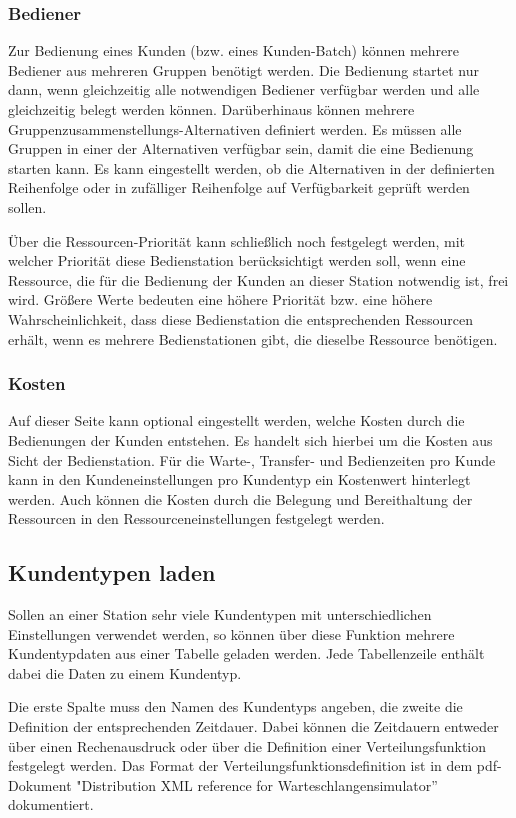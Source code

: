 \subsubsection*{Bediener}

Zur Bedienung eines Kunden (bzw. eines Kunden-Batch) können mehrere Bediener aus mehreren Gruppen benötigt werden. Die Bedienung
startet nur dann, wenn gleichzeitig alle notwendigen Bediener verfügbar werden und alle gleichzeitig belegt werden können.
Darüberhinaus können mehrere Gruppenzusammenstellungs-Alternativen definiert werden. Es müssen alle Gruppen in einer der
Alternativen verfügbar sein, damit die eine Bedienung starten kann. Es kann eingestellt werden, ob die Alternativen in der definierten Reihenfolge
oder in zufälliger Reihenfolge auf Verfügbarkeit geprüft werden sollen.

Über die Ressourcen-Priorität kann schließlich noch festgelegt werden, mit welcher Priorität diese Bedienstation
berücksichtigt werden soll, wenn eine Ressource, die für die Bedienung der Kunden an dieser Station notwendig ist,
frei wird. Größere Werte bedeuten eine höhere Priorität bzw. eine höhere Wahrscheinlichkeit, dass diese Bedienstation
die entsprechenden Ressourcen erhält, wenn es mehrere Bedienstationen gibt, die dieselbe Ressource benötigen.

\subsubsection*{Kosten}

Auf dieser Seite kann optional eingestellt werden, welche Kosten durch die Bedienungen der Kunden entstehen.
Es handelt sich hierbei um die Kosten aus Sicht der Bedienstation. Für die Warte-, Transfer- und Bedienzeiten pro
Kunde kann in den Kundeneinstellungen pro Kundentyp ein Kostenwert hinterlegt werden. Auch können die Kosten durch
die Belegung und Bereithaltung der Ressourcen in den Ressourceneinstellungen festgelegt werden.

\subsection*{Kundentypen laden}

Sollen an einer Station sehr viele Kundentypen mit unterschiedlichen Einstellungen verwendet werden, so können über diese Funktion mehrere Kundentypdaten aus einer Tabelle geladen werden. Jede Tabellenzeile enthält dabei die Daten zu einem Kundentyp.

Die erste Spalte muss den Namen des Kundentyps angeben, die zweite die Definition der entsprechenden Zeitdauer.
Dabei können die Zeitdauern entweder über einen Rechenausdruck oder über die Definition einer
Verteilungsfunktion festgelegt werden. Das Format der Verteilungsfunktionsdefinition ist in dem pdf-Dokument
"Distribution XML reference for Warteschlangensimulator'' dokumentiert.


